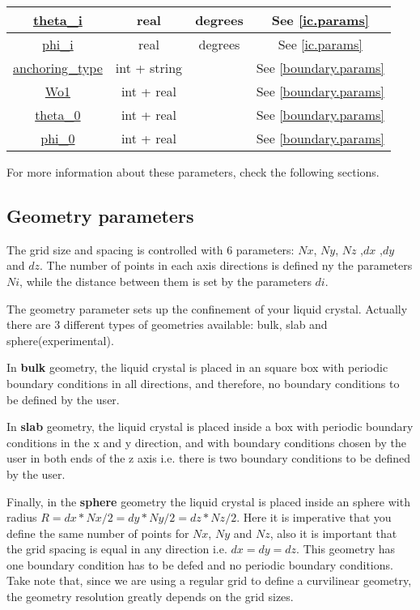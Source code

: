 \documentclass{article}
\begin{document}
\begin{center}
\begin{longtable}{|c|c|c|c|}
          \hline 
          \hyperref[ic.param]{theta\_i} &	real & degrees & See \ref{ic.params} \\ 
          \hline 
          \hyperref[ic.param]{phi\_i} &	real & degrees  & See \ref{ic.params}\\ 
          \hline 
          \hyperref[boundary.params]{anchoring\_type} & int + string & & See \ref{boundary.params}\\ 
          \hline 
          \hyperref[boundary.params]{Wo1}& int + real & &  See \ref{boundary.params}  \\ 
          \hline 
          \hyperref[boundary.params]{theta\_0} &  int + real  & & See \ref{boundary.params} \\ 
          \hline 
          \hyperref[boundary.params]{phi\_0} &	 int + real  & & See \ref{boundary.params} \\ 
          \hline 
	\end{longtable} 
\end{center}

For more information about these parameters, check the following sections.


\subsection{Geometry parameters}\label{geometry}

The grid size and spacing is controlled with 6 parameters: $Nx$, $Ny$,
$Nz$ ,$dx$ ,$dy$ and $dz$. The number of points in each axis
directions is defined ny the parameters $Ni$, while the distance
between them is set by the parameters $di$.

The geometry parameter sets up the confinement of your liquid
crystal. Actually there are 3 different types of geometries available:
bulk, slab and sphere(experimental).

In \textbf{bulk} geometry, the liquid crystal is placed in an square box
with periodic boundary conditions in all directions, and therefore, no boundary conditions to be defined by the user.

In \textbf{slab} geometry, the liquid crystal is placed inside a box
with periodic boundary conditions in the x and y direction, and with
boundary conditions chosen by the user in both ends of the z
axis i.e. there is two boundary conditions to be defined by the user. 

Finally, in the \textbf{sphere} geometry the liquid crystal is placed
inside an sphere with radius $R=dx*Nx/2=dy*Ny/2=dz*Nz/2$. Here it
is imperative that you define the same number of points for $Nx$, $Ny$
and $Nz$, also it is important that the grid spacing is equal in any
direction i.e. $dx=dy=dz$. This geometry has one boundary condition
has to be defed and no periodic boundary conditions. Take note that,
since we are using a regular grid to define a curvilinear geometry,
the geometry resolution greatly depends on the grid sizes.
\end{document}
